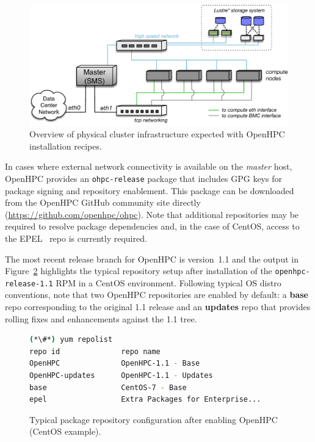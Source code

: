 \documentclass{sig-alternate-05-2015}
\begin{document}
\begin{figure}[h]
  \includegraphics[width=0.95\linewidth]{figures/ohpc-arch-small.pdf}
  \caption{Overview of physical cluster infrastructure expected with OpenHPC
    installation recipes.}
  \label{fig:cluster_arch}
\end{figure}

 In cases where external network connectivity is
available on the {\em master} host, OpenHPC provides an \texttt{ohpc-release}
package that includes GPG keys for package signing and repository enablement.
This package can be downloaded from the OpenHPC GitHub community site directly
(\url{https://github.com/openhpc/ohpc}). Note that additional repositories may
be required to resolve package dependencies and, in the case of CentOS, access
to the EPEL~\cite{epel_url} repo is currently required.

The most recent release branch for OpenHPC is version~1.1 and the output in
Figure~\ref{fig:repolist} highlights the typical repository setup after
installation of the \texttt{openhpc-release-1.1} RPM in a CentOS
environment. Following typical OS distro conventions, note that two OpenHPC
repositories are enabled by default: a { \bf base} repo corresponding to the
original 1.1 release and an {\bf updates} repo that provides rolling fixes and
enhancements against the 1.1 tree.

\begin{figure}[h]
\begin{lstlisting}[language=bash,keywords={}]
(*\#*) yum repolist
repo id              repo name
OpenHPC              OpenHPC-1.1 - Base
OpenHPC-updates      OpenHPC-1.1 - Updates
base                 CentOS-7 - Base
epel                 Extra Packages for Enterprise...
\end{lstlisting}
\vspace*{-0.3cm}
  \caption{Typical package repository configuration after enabling OpenHPC
    (CentOS example).}
    \label{fig:repolist}
\end{figure}
\end{document}
